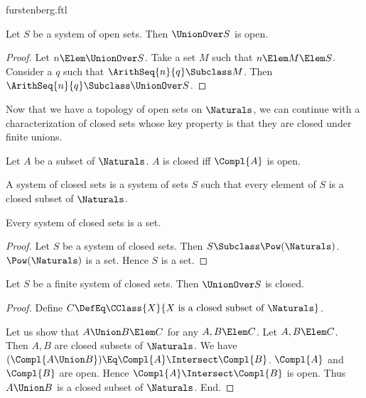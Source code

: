 \documentclass{stex}
\begin{document}
\begin{smodule}{furstenberg.ftl}
\begin{forthel}
  \begin{lemma}
    Let $S$ be a system of open sets.
    Then $\UnionOver S$ is open.
  \end{lemma}
  \begin{proof}
    Let $n \Elem \UnionOver S$.
    Take a set $M$ such that $n \Elem M \Elem S$.
    Consider a $q$ such that $\ArithSeq{n}{q} \Subclass M$.
    Then $\ArithSeq{n}{q} \Subclass \UnionOver S$.
  \end{proof}
\end{forthel}

Now that we have a topology of open sets on $\Naturals$, we can continue
with a characterization of closed sets whose key property is that they are
closed under finite unions.

\begin{forthel}
  \begin{definition}[for=closed]
    Let $A$ be a subset of $\Naturals$.
    $A$ is closed iff $\Compl{A}$ is open.
  \end{definition}

  \begin{definition}[for=system of closed sets]
    A system of closed sets is a system of sets $S$ such that every element of
    $S$ is a closed subset of $\Naturals$.
  \end{definition}

  \begin{lemma}
    Every system of closed sets is a set.
  \end{lemma}
  \begin{proof}
    Let $S$ be a system of closed sets.
    Then $S \Subclass \Pow(\Naturals)$.
    $\Pow(\Naturals)$ is a set.
    Hence $S$ is a set.
  \end{proof}

  \begin{lemma}
    Let $S$ be a finite system of closed sets.
    Then $\UnionOver S$ is closed.
  \end{lemma}
  \begin{proof}
    Define $C \DefEq \CClass{X}{X \text{ is a closed subset of } \Naturals}$.

    Let us show that $A \Union B \Elem C$ for any $A, B \Elem C$.
      Let $A, B \Elem C$.
      Then $A, B$ are closed subsets of $\Naturals$.
      We have $(\Compl{A \Union B}) \Eq \Compl{A} \Intersect \Compl{B}$. %
      $\Compl{A}$ and $\Compl{B}$ are open.
      Hence $\Compl{A} \Intersect \Compl{B}$ is open.
      Thus $A \Union B$ is a closed subset of $\Naturals$.
    End.


\end{proof}
\end{forthel}
\end{smodule}
\end{document}
